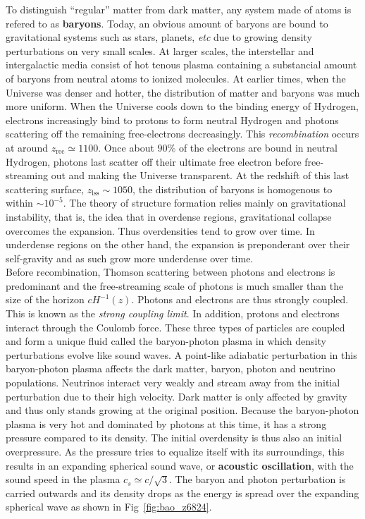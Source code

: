 To distinguish ``regular'' matter from dark matter, any system made of atoms is refered to as \textbf{baryons}. Today, an obvious amount of baryons are bound to gravitational systems such as stars, planets, \textit{etc} due to growing density perturbations on very small scales. At larger scales, the interstellar and intergalactic media consist of hot tenous plasma containing a substancial amount of baryons from neutral atoms to ionized molecules. At earlier times, when the Universe was denser and hotter, the distribution of matter and baryons was much more uniform. When the Universe cools down to the binding energy of Hydrogen, electrons increasingly bind to protons to form neutral Hydrogen and photons scattering off the remaining free-electrons decreasingly. This \emph{recombination} occurs at around $z_{\mathrm{rec}} \simeq 1100$. Once about $90\%$ of the electrons are bound in neutral Hydrogen, photons last scatter off their ultimate free electron before free-streaming out and making the Universe transparent. At the redshift of this last scattering surface, $z_{\mathrm{lss}} \sim 1050$, the distribution of baryons is homogenous to within $\sim 10^{-5}$. The theory of structure formation relies mainly on gravitational instability, that is, the idea that in overdense regions, gravitational collapse overcomes the expansion. Thus overdensities tend to grow over time. In underdense regions on the other hand, the expansion is preponderant over their self-gravity and as such grow more underdense over time. \\

Before recombination, Thomson scattering between photons and electrons is predominant and the free-streaming scale of photons is much smaller than the size of the horizon $c H^{-1}(z)$. Photons and electrons are thus strongly coupled. This is known as the \emph{strong coupling limit}. In addition, protons and electrons interact through the Coulomb force. These three types of particles are coupled and form a unique
fluid called the baryon-photon plasma in which density perturbations evolve like sound waves. A point-like adiabatic perturbation in this baryon-photon plasma affects the dark matter, baryon, photon and neutrino populations. Neutrinos interact very weakly and stream away from the initial perturbation due to their high velocity. Dark matter is only affected by gravity and thus only stands growing at the original position. Because the baryon-photon plasma is
very hot and dominated by photons at this time, it has a strong pressure compared to its density. The initial overdensity is thus
also an initial overpressure. As the pressure tries to equalize itself with its surroundings, this results in an expanding spherical
sound wave, or \textbf{acoustic oscillation}, with the sound speed in the plasma $c_s \simeq c / \sqrt{3}$. The baryon and photon perturbation is carried outwards and its density drops as the energy is spread over the expanding
spherical wave as shown in Fig~\ref{fig:bao_z6824}. \\

